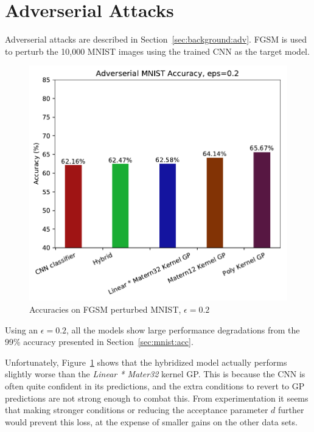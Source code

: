 \documentclass{article}
\begin{document}
\section{Adverserial Attacks}
\label{sec:adversarial}
Adverserial attacks are described in Section~\ref{sec:background:adv}. FGSM is used to perturb the 10,000 MNIST images using the trained CNN as the target model.

\begin{figure}[htb]
\centering
\includegraphics[width=\hsize]{./figures/adversarial/accuracies_eps02.pdf}
\caption{Accuracies on FGSM perturbed MNIST, $\epsilon=0.2$}
\label{fig:adv:accuracies}
\end{figure}

Using an $\epsilon=0.2$, all the models show large performance degradations from the 99\% accuracy presented in Section~\ref{sec:mnist:acc}. 

Unfortunately, Figure~\ref{fig:adv:accuracies} shows that the hybridized model actually performs slightly worse than the \textit{Linear * Mater32} kernel GP. This is because the CNN is often quite confident in its predictions, and the extra conditions to revert to GP predictions are not strong enough to combat this. From experimentation it seems that making stronger conditions or reducing the acceptance parameter $d$ further would prevent this loss, at the expense of smaller gains on the other data sets.
\end{document}

